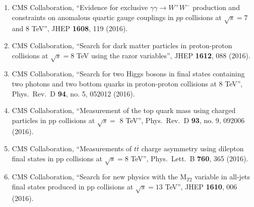 \begin{enumerate}
\item CMS Collaboration, ``Evidence for exclusive $\gamma\gamma \to W^+ W^-$ production and constraints on anomalous quartic gauge couplings in $pp$ collisions at $ \sqrt{s}=7 $ and 8 TeV'', JHEP {\bf 1608}, 119 (2016).

\item CMS Collaboration, ``Search for dark matter particles in proton-proton collisions at $ \sqrt{s}=8 $ TeV using the razor variables'', JHEP {\bf 1612}, 088 (2016).

\item CMS Collaboration, ``Search for two Higgs bosons in final states containing two photons and two bottom quarks in proton-proton collisions at 8 TeV'', Phys.\ Rev.\ D {\bf 94}, no. 5, 052012 (2016).

\item CMS Collaboration, ``Measurement of the top quark mass using charged particles in pp collisions at $\sqrt s =$ 8 TeV'', Phys.\ Rev.\ D {\bf 93}, no. 9, 092006 (2016).

\item CMS Collaboration, ``Measurements of $t \bar t$ charge asymmetry using dilepton final states in pp collisions at $\sqrt s=8$ TeV'', Phys.\ Lett.\ B {\bf 760}, 365 (2016).

\item CMS Collaboration, ``Search for new physics with the M$_{T2}$ variable in all-jets final states produced in pp collisions at $ \sqrt{s}=13 $ TeV'', JHEP {\bf 1610}, 006 (2016).


\end{enumerate}
